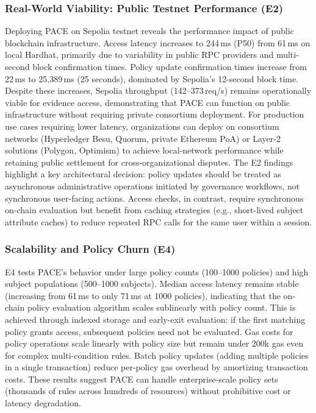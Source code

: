 \documentclass[pdflatex,sn-mathphys-num]{sn-jnl}
\begin{document}
\subsubsection{Real-World Viability: Public Testnet Performance (E2)}

Deploying PACE on Sepolia testnet reveals the performance impact of public blockchain infrastructure. Access latency increases to 244\,ms (P50) from 61\,ms on local Hardhat, primarily due to variability in public RPC providers and multi-second block confirmation times. Policy update confirmation times increase from 22\,ms to 25,389\,ms (25 seconds), dominated by Sepolia's 12-second block time. Despite these increases, Sepolia throughput (142--373\,req/s) remains operationally viable for evidence access, demonstrating that PACE can function on public infrastructure without requiring private consortium deployment. For production use cases requiring lower latency, organizations can deploy on consortium networks (Hyperledger Besu, Quorum, private Ethereum PoA) or Layer-2 solutions (Polygon, Optimism) to achieve local-network performance while retaining public settlement for cross-organizational disputes. The E2 findings highlight a key architectural decision: policy updates should be treated as asynchronous administrative operations initiated by governance workflows, not synchronous user-facing actions. Access checks, in contrast, require synchronous on-chain evaluation but benefit from caching strategies (e.g., short-lived subject attribute caches) to reduce repeated RPC calls for the same user within a session.

\subsubsection{Scalability and Policy Churn (E4)}

E4 tests PACE's behavior under large policy counts (100--1000 policies) and high subject populations (500--1000 subjects). Median access latency remains stable (increasing from 61\,ms to only 71\,ms at 1000 policies), indicating that the on-chain policy evaluation algorithm scales sublinearly with policy count. This is achieved through indexed storage and early-exit evaluation: if the first matching policy grants access, subsequent policies need not be evaluated. Gas costs for policy operations scale linearly with policy size but remain under 200k gas even for complex multi-condition rules. Batch policy updates (adding multiple policies in a single transaction) reduce per-policy gas overhead by amortizing transaction costs. These results suggest PACE can handle enterprise-scale policy sets (thousands of rules across hundreds of resources) without prohibitive cost or latency degradation.
\end{document}
